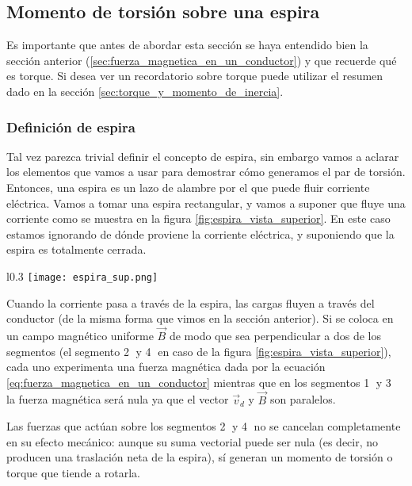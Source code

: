 \subsection{Momento de torsión sobre una espira}

Es importante que antes de abordar esta sección se haya entendido bien la sección anterior (\ref{sec:fuerza_magnetica_en_un_conductor}) y que recuerde qué es torque. Si desea ver un recordatorio sobre torque puede utilizar el resumen dado en la sección \ref{sec:torque_y_momento_de_inercia}.

\subsubsection{Definición de espira}

Tal vez parezca trivial definir el concepto de espira, sin embargo vamos a aclarar los elementos que vamos a usar para demostrar cómo generamos el par de torsión. Entonces, una espira es un lazo de alambre por el que puede fluir corriente eléctrica. Vamos a tomar una espira rectangular, y vamos a suponer que fluye una corriente como se muestra en la figura \ref{fig:espira_vista_superior}. En este caso estamos ignorando de dónde proviene la corriente eléctrica, y suponiendo que la espira es totalmente cerrada.
\begin{wrapfigure}{l}{0.3\textwidth}
  \centering
  \texttt{[image: espira\_sup.png]}
  \caption{Vista superior de una espira rectangular}
  \label{fig:espira_vista_superior}
\end{wrapfigure}

Cuando la corriente pasa a través de la espira, las cargas fluyen a través del conductor (de la misma forma que vimos en la sección anterior). Si se coloca en un campo magnético uniforme \(\vec{B}\) de modo que sea perpendicular a dos de los segmentos (el segmento \textcircled{2} y \textcircled{4} en caso de la figura \ref{fig:espira_vista_superior}), cada uno experimenta una fuerza magnética dada por la ecuación \eqref{eq:fuerza_magnetica_en_un_conductor} mientras que en los segmentos \textcircled{1} y \textcircled{3} la fuerza magnética será nula ya que el vector \(\vec{v}_d\) y \(\vec{B}\) son paralelos. 

Las fuerzas que actúan sobre los segmentos \textcircled{2} y \textcircled{4} no se cancelan completamente en su efecto mecánico: aunque su suma vectorial puede ser nula (es decir, no producen una traslación neta de la espira), sí generan un momento de torsión o torque que tiende a rotarla.

